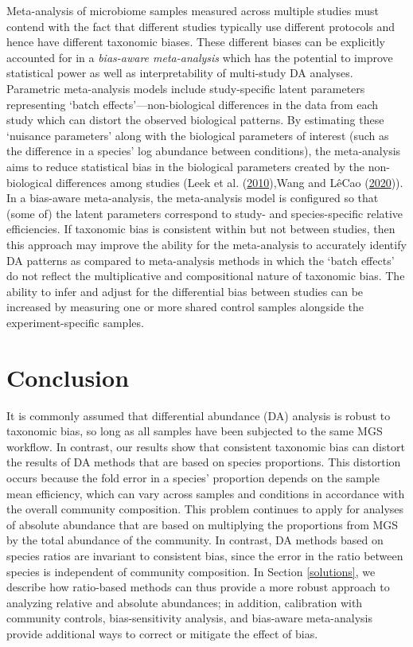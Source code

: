 \documentclass[
]{article}
\begin{document}
Meta-analysis of microbiome samples measured across multiple studies must contend with the fact that different studies typically use different protocols and hence have different taxonomic biases.
These different biases can be explicitly accounted for in a \emph{bias-aware meta-analysis} which has the potential to improve statistical power as well as interpretability of multi-study DA analyses.
Parametric meta-analysis models include study-specific latent parameters representing `batch effects'---non-biological differences in the data from each study which can distort the observed biological patterns.
By estimating these `nuisance parameters' along with the biological parameters of interest (such as the difference in a species' log abundance between conditions), the meta-analysis aims to reduce statistical bias in the biological parameters created by the non-biological differences among studies (Leek et al. (\protect\hyperlink{ref-leek2010tack}{2010}),Wang and LêCao (\protect\hyperlink{ref-wang2019mana}{2020})).
In a bias-aware meta-analysis, the meta-analysis model is configured so that (some of) the latent parameters correspond to study- and species-specific relative efficiencies.
If taxonomic bias is consistent within but not between studies, then this approach may improve the ability for the meta-analysis to accurately identify DA patterns as compared to meta-analysis methods in which the `batch effects' do not reflect the multiplicative and compositional nature of taxonomic bias.
The ability to infer and adjust for the differential bias between studies can be increased by measuring one or more shared control samples alongside the experiment-specific samples.

\hypertarget{conclusion}{%
\section{Conclusion}\label{conclusion}}

It is commonly assumed that differential abundance (DA) analysis is robust to taxonomic bias, so long as all samples have been subjected to the same MGS workflow.
In contrast, our results show that consistent taxonomic bias can distort the results of DA methods that are based on species proportions.
This distortion occurs because the fold error in a species' proportion depends on the sample mean efficiency, which can vary across samples and conditions in accordance with the overall community composition.
This problem continues to apply for analyses of absolute abundance that are based on multiplying the proportions from MGS by the total abundance of the community.
In contrast, DA methods based on species ratios are invariant to consistent bias, since the error in the ratio between species is independent of community composition.
In Section \ref{solutions}, we describe how ratio-based methods can thus provide a more robust approach to analyzing relative and absolute abundances;
in addition, calibration with community controls, bias-sensitivity analysis, and bias-aware meta-analysis provide additional ways to correct or mitigate the effect of bias.
\end{document}
